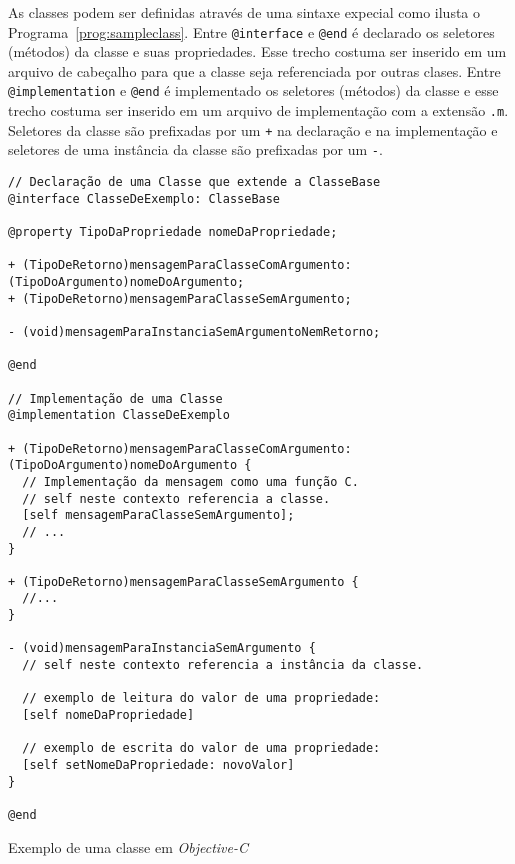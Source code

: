 As classes podem ser definidas através de uma sintaxe expecial como ilusta o Programa~\ref{prog:sampleclass}.
Entre \texttt{@interface} e \texttt{@end} é declarado os seletores (métodos) da classe e suas propriedades. Esse
trecho costuma ser inserido em um arquivo de cabeçalho para que a classe seja referenciada por outras clases.
Entre \texttt{@implementation} e \texttt{@end} é implementado os seletores (métodos) da classe e esse trecho costuma
ser inserido em um arquivo de implementação com a extensão \texttt{.m}.
Seletores da classe são prefixadas por um \texttt{+} na declaração e na implementação
e seletores de uma instância da classe são prefixadas por um \texttt{-}.

\begin{program}
  \centering

\lstset{language=[Objective]C}
\begin{lstlisting}[style=wider]
// Declaração de uma Classe que extende a ClasseBase
@interface ClasseDeExemplo: ClasseBase

@property TipoDaPropriedade nomeDaPropriedade;

+ (TipoDeRetorno)mensagemParaClasseComArgumento:(TipoDoArgumento)nomeDoArgumento;
+ (TipoDeRetorno)mensagemParaClasseSemArgumento;

- (void)mensagemParaInstanciaSemArgumentoNemRetorno;

@end

// Implementação de uma Classe
@implementation ClasseDeExemplo

+ (TipoDeRetorno)mensagemParaClasseComArgumento:(TipoDoArgumento)nomeDoArgumento {
  // Implementação da mensagem como uma função C.
  // self neste contexto referencia a classe.
  [self mensagemParaClasseSemArgumento];
  // ...
}

+ (TipoDeRetorno)mensagemParaClasseSemArgumento {
  //...
}

- (void)mensagemParaInstanciaSemArgumento {
  // self neste contexto referencia a instância da classe.

  // exemplo de leitura do valor de uma propriedade:
  [self nomeDaPropriedade]

  // exemplo de escrita do valor de uma propriedade:
  [self setNomeDaPropriedade: novoValor]
}

@end
\end{lstlisting}

  \caption{Exemplo de uma classe em \emph{Objective-C}\label{prog:sampleclass}}
\end{program}

